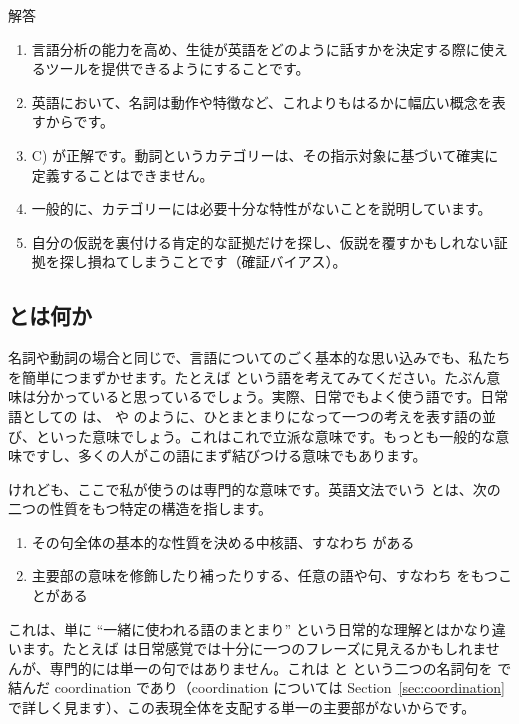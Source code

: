 \begin{tblsfilled}{解答}
\begin{enumerate}[noitemsep, leftmargin=*]
    \item 言語分析の能力を高め、生徒が英語をどのように話すかを決定する際に使えるツールを提供できるようにすることです。
    \item 英語において、名詞は動作や特徴など、これよりもはるかに幅広い概念を表すからです。
    \item C) が正解です。動詞というカテゴリーは、その指示対象に基づいて確実に定義することはできません。
    \item 一般的に、カテゴリーには必要十分な特性がないことを説明しています。
    \item 自分の仮説を裏付ける肯定的な証拠だけを探し、仮説を覆すかもしれない証拠を探し損ねてしまうことです（確証バイアス）。
\end{enumerate}
\end{tblsfilled}

\subsection{ とは何か}\label{sec:phrases}

名詞や動詞の場合と同じで、言語についてのごく基本的な思い込みでも、私たちを簡単につまずかせます。たとえば  という語を考えてみてください。たぶん意味は分かっていると思っているでしょう。実際、日常でもよく使う語です。日常語としての  は、 や  のように、ひとまとまりになって一つの考えを表す語の並び、といった意味でしょう。これはこれで立派な意味です。もっとも一般的な意味ですし、多くの人がこの語にまず結びつける意味でもあります。

けれども、ここで私が使うのは専門的な意味です。英語文法でいう  とは、次の二つの性質をもつ特定の構造を指します。
\begin{enumerate}[noitemsep]
    \item その句全体の基本的な性質を決める中核語、すなわち  がある
    \item 主要部の意味を修飾したり補ったりする、任意の語や句、すなわち  をもつことがある
\end{enumerate}
これは、単に \enquote{一緒に使われる語のまとまり} という日常的な理解とはかなり違います。たとえば  は日常感覚では十分に一つのフレーズに見えるかもしれませんが、専門的には単一の句ではありません。これは  と  という二つの名詞句を  で結んだ coordination であり（coordination については Section~\ref{sec:coordination} で詳しく見ます）、この表現全体を支配する単一の主要部がないからです。


